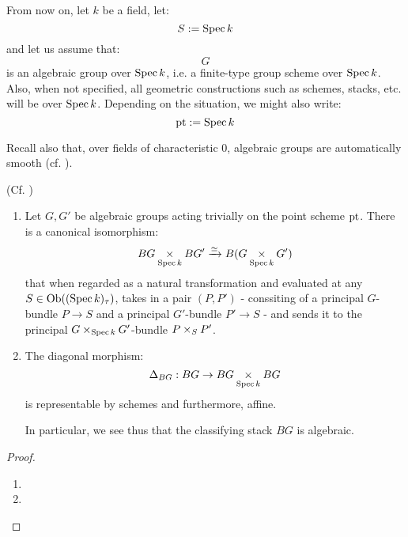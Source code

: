         \begin{convention}
            From now on, let $k$ be a field, let:
                $$S := \operatorname{Spec} k$$
            and let us assume that:
                $$G$$
            is an algebraic group over $\operatorname{Spec} k$, i.e. a finite-type group scheme over $\operatorname{Spec} k$. Also, when not specified, all geometric constructions such as schemes, stacks, etc. will be over $\operatorname{Spec} k$. Depending on the situation, we might also write:
                $$\mathrm{pt} := \operatorname{Spec} k$$
            
            Recall also that, over fields of characteristic $0$, algebraic groups are automatically smooth (cf. \cite[\href{https://stacks.math.columbia.edu/tag/047N}{Tag 047N}]{stacks}).
        \end{convention}

        \begin{lemma} \label{lemma: classifying_stacks_are_algebraic}
            (Cf. \cite[Lemmas 2.5.1 and 2.5.2]{wang_algebraicity_of_Bun_G})
            \begin{enumerate}
                \item Let $G, G'$ be algebraic groups acting trivially on the point scheme $\mathrm{pt}$. There is a canonical isomorphism:
                    $$BG \x_{\Spec k} BG' \xrightarrow[]{\cong} B(G \x_{\Spec k} G')$$
                that when regarded as a natural transformation and evaluated at any $S \in \mathrm{Ob}((\operatorname{Spec} k)_{\tau})$, takes in a pair $(P, P')$ - conssiting of a principal $G$-bundle $P \to S$ and a principal $G'$-bundle $P' \to S$ - and sends it to the principal $G \x_{\Spec k} G'$-bundle $P \x_S P'$.
                \item The diagonal morphism:
                    $$\Delta_{BG}: BG \to BG \x_{\Spec k} BG$$
                is representable by schemes and furthermore, affine. 

                In particular, we see thus that the classifying stack $BG$ is algebraic.
            \end{enumerate}
        \end{lemma}
            \begin{proof}
                \begin{enumerate}
                    \item 
                    \item 
                \end{enumerate}
            \end{proof}
